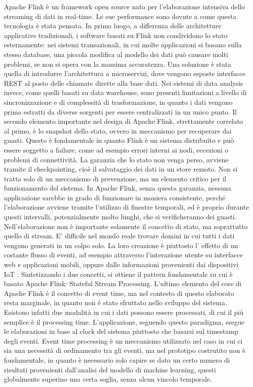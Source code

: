Apache Flink è un framework open source nato per l'elaborazione intensiva dello streaming di dati in real-time. Le sue performance sono dovute a come questa tecnologia è stata pensata. In primo luogo, a differenza delle architetture applicative tradizionali, i software basati su Flink non condividono lo stato esternamente: nei sistemi transazionali, in cui molte applicazioni si basano sulla stesso database, una piccola modifica al modello dei dati può causare molti problemi, se non si opera con la massima accuratezza. Una soluzione è stata quella di introdurre l'architettura a microservizi, dove vengono esposte interfacce REST al posto delle chiamate dirette alla base dati. Nei sistemi di data analysis invece, come quelli basati su data warehouse, sono presenti limitazioni a livello di sincronizzazione e di complessità di trasformazione, in quanto i dati vengono prima estratti da diverse sorgenti per essere centralizzati in un unico punto. Il secondo elemento importante nel design di Apache Flink, strettamente correlato al primo, è lo snapshot dello stato, ovvero in meccanismo per recuperare dai guasti. Questo è fondamentale in quanto Flink è un sistema distribuito e può essere soggetto a failure, come ad esempio errori interni ai nodi, eccezioni o problemi di connettività. La garanzia che lo stato non venga perso, avviene tramite il checkpointing, cioè il salvataggio dei dati in un store remoto. Non si tratta solo di un meccanismo di prevenzione, ma un elemento critico per il funzionamento del sistema. In Apache Flink, senza questa garanzia, nessuna applicazione sarebbe in grado di funzionare in maniera consistente, perché l'elaborazione avviene tramite l'utilizzo di finestre temporali, ed è proprio durante questi intervalli, potenzialmente molto lunghi, che si verificheranno dei guasti. Nell'elaborazione non è importante solamente il concetto di stato, ma soprattutto quello di stream. E' difficile nel mondo reale trovare domini in cui tutti i dati vengono generati in un colpo solo. La loro creazione è piuttosto l' effetto di un costante flusso di eventi, ad esempio attraverso l'interazione utente su interfacce web e applicazioni mobili, oppure dalle informazioni provenienti dai dispositivi IoT \cite{a14Flink}.
Sintetizzando i due concetti, si ottiene il pattern fondamentale su cui è basato Apache Flink: Stateful Stream Processing. L'ultimo elemento del core di Apache Flink è il concetto di event time, ma nel contesto di questo elaborato resta marginale, in quanto non è stato sfruttato nello sviluppo del sistema. %
Esistono infatti due modalità in cui i dati possono essere processati, di cui il più semplice è il processing time. L'applicazione, seguendo questo paradigma, esegue le elaborazioni in base al clock del sistema piuttosto che basarsi sul timestamp degli eventi. Event time processing è un meccanismo utilizzato nel caso in cui ci sia una necessità di ordinamento tra gli eventi, ma nel prototipo costrutito non è fondamentale, in quanto è necessario solo capire se dato un certo numero di risultati provenienti dall'analisi del modello di machine learning, questi globalmente superino una certa soglia, senza alcun vincolo temporale.

